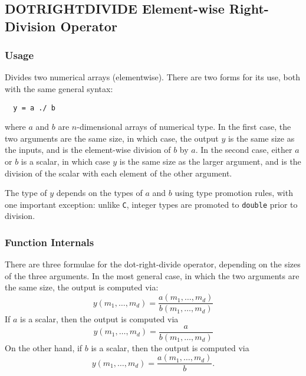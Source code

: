 %
%
%
\subsection{DOTRIGHTDIVIDE Element-wise Right-Division Operator}
\subsubsection{Usage}
Divides two numerical arrays (elementwise).  There are two forms
for its use, both with the same general syntax:
\begin{verbatim}
  y = a ./ b
\end{verbatim}
where $a$ and $b$ are $n$-dimensional arrays of numerical type.  In the
first case, the two arguments are the same size, in which case, the 
output $y$ is the same size as the inputs, and is the element-wise
division of $b$ by $a$.  In the second case, either $a$ or $b$ is a scalar, 
in which case $y$ is the same size as the larger argument,
and is the division of the scalar with each element of the other argument.

The type of $y$ depends on the types of $a$ and $b$ using type 
promotion rules, with one important exception: unlike \verb|C|, integer
types are promoted to \verb|double| prior to division.
\subsubsection{Function Internals}
There are three formulae for the dot-right-divide operator, depending on the
sizes of the three arguments.  In the most general case, in which 
the two arguments are the same size, the output is computed via:
\[
y(m_1,\ldots,m_d) = \frac{a(m_1,\ldots,m_d)}{b(m_1,\ldots,m_d)}
\]
If $a$ is a scalar, then the output is computed via
\[
y(m_1,\ldots,m_d) = \frac{a}{b(m_1,\ldots,m_d)}
\]
On the other hand, if $b$ is a scalar, then the output is computed via
\[
y(m_1,\ldots,m_d) = \frac{a(m_1,\ldots,m_d)}{b}.
\]
